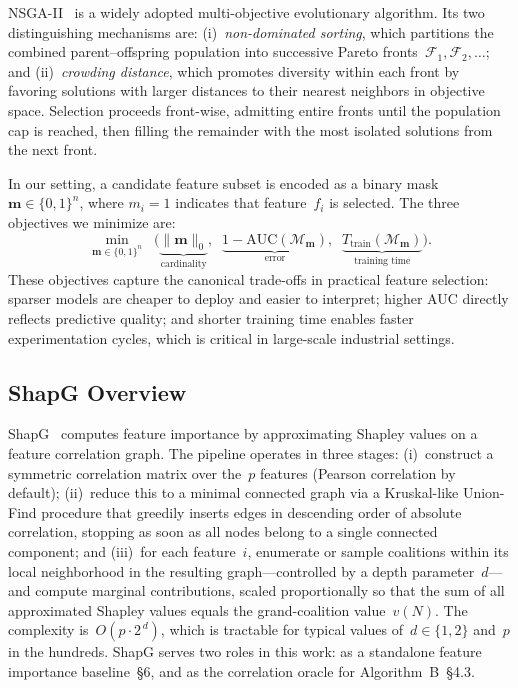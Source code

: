 \documentclass{article} %
\begin{document}
NSGA-II~\citep{deb2002fast} is a widely adopted multi-objective evolutionary algorithm. Its two distinguishing mechanisms are: (i)~{\em non-dominated sorting}, which partitions the combined parent--offspring population into successive Pareto fronts~$\mathcal{F}_1, \mathcal{F}_2, \dots$; and (ii)~{\em crowding distance}, which promotes diversity within each front by favoring solutions with larger distances to their nearest neighbors in objective space. Selection proceeds front-wise, admitting entire fronts until the population cap is reached, then filling the remainder with the most isolated solutions from the next front.

In our setting, a candidate feature subset is encoded as a binary mask~$\mathbf{m} \in \{0,1\}^n$, where $m_i = 1$ indicates that feature~$f_i$ is selected. The three objectives we minimize are:
\begin{equation}
\min_{\mathbf{m} \in \{0,1\}^n} \;\; \bigl( \underbrace{\|\mathbf{m}\|_0}_{\text{cardinality}},\;\; \underbrace{1 - \text{AUC}(\mathcal{M}_{\mathbf{m}})}_{\text{error}},\;\; \underbrace{T_{\text{train}}(\mathcal{M}_{\mathbf{m}})}_{\text{training time}} \bigr).
\label{eq:mo}
\end{equation}
These objectives capture the canonical trade-offs in practical feature selection: sparser models are cheaper to deploy and easier to interpret; higher AUC directly reflects predictive quality; and shorter training time enables faster experimentation cycles, which is critical in large-scale industrial settings.

\subsection{ShapG Overview}

ShapG~\citep{zhao2025shapg} computes feature importance by approximating Shapley values on a feature correlation graph. The pipeline operates in three stages: (i)~construct a symmetric correlation matrix over the~$p$ features (Pearson correlation by default); (ii)~reduce this to a minimal connected graph via a Kruskal-like Union-Find procedure that greedily inserts edges in descending order of absolute correlation, stopping as soon as all nodes belong to a single connected component; and (iii)~for each feature~$i$, enumerate or sample coalitions within its local neighborhood in the resulting graph---controlled by a depth parameter~$d$---and compute marginal contributions, scaled proportionally so that the sum of all approximated Shapley values equals the grand-coalition value~$v(N)$. The complexity is~$O(p \cdot 2^{\,d})$, which is tractable for typical values of~$d \in \{1, 2\}$ and~$p$ in the hundreds. ShapG serves two roles in this work: as a standalone feature importance baseline~\S6, and as the correlation oracle for Algorithm~B~\S4.3.
\end{document}

